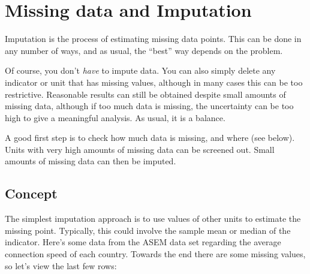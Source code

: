 \documentclass[
]{book}
\newenvironment{Shaded}{\begin{snugshade}}{\end{snugshade}}
\newcommand{\AttributeTok}[1]{\textcolor[rgb]{0.77,0.63,0.00}{#1}}
\newcommand{\DecValTok}[1]{\textcolor[rgb]{0.00,0.00,0.81}{#1}}
\newcommand{\DocumentationTok}[1]{\textcolor[rgb]{0.56,0.35,0.01}{\textbf{\textit{#1}}}}
\newcommand{\FunctionTok}[1]{\textcolor[rgb]{0.00,0.00,0.00}{#1}}
\newcommand{\NormalTok}[1]{#1}
\newcommand{\OtherTok}[1]{\textcolor[rgb]{0.56,0.35,0.01}{#1}}
\newcommand{\SpecialCharTok}[1]{\textcolor[rgb]{0.00,0.00,0.00}{#1}}
\begin{document}
\hypertarget{missing-data-and-imputation}{%
\chapter{Missing data and Imputation}\label{missing-data-and-imputation}}

Imputation is the process of estimating missing data points. This can be done in any number of ways, and as usual, the ``best'' way depends on the problem.

Of course, you don't \emph{have} to impute data. You can also simply delete any indicator or unit that has missing values, although in many cases this can be too restrictive. Reasonable results can still be obtained despite small amounts of missing data, although if too much data is missing, the uncertainty can be too high to give a meaningful analysis. As usual, it is a balance.

A good first step is to check how much data is missing, and where (see below). Units with very high amounts of missing data can be screened out. Small amounts of missing data can then be imputed.

\hypertarget{concept}{%
\section{Concept}\label{concept}}

The simplest imputation approach is to use values of other units to estimate the missing point. Typically, this could involve the sample mean or median of the indicator. Here's some data from the ASEM data set regarding the average connection speed of each country. Towards the end there are some missing values, so let's view the last few rows:

\begin{Shaded}
\end{Shaded}
\end{document}
